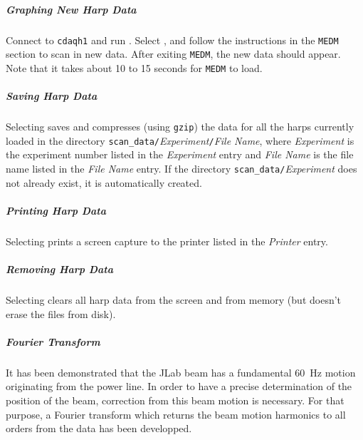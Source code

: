	\subparagraph{Graphing New Harp Data}

Connect to {\tt cdaqh1} and run .  Select , and follow the
instructions in the {\tt MEDM} section to scan in new data.  After exiting {\tt MEDM}, the new data should
appear. Note that it takes about 10 to 15 seconds for {\tt MEDM} to load.

	\subparagraph{Saving Harp Data}

Selecting  saves and compresses (using {\tt gzip}) the data for all the harps
currently loaded in the directory {\tt scan\_data/}{\it Experiment}{\tt /}{\it File Name}, where
{\it Experiment} is the experiment number listed in the {\it Experiment} entry and {\it File Name}
is the file name listed in the {\it File Name} entry.  If the directory {\tt scan\_data/}{\it Experiment}
does not already exist, it is automatically created.

	\subparagraph{Printing Harp Data}

Selecting  prints a screen capture to the printer listed in the {\it Printer} entry.

	\subparagraph{Removing Harp Data}

Selecting  clears all harp data from the screen and from memory (but doesn't
erase the files from disk).


	\subparagraph{Fourier Transform}

It has been demonstrated that the JLab beam has a fundamental 60~Hz motion originating from the power
line. In order to have a precise determination of the position of the beam, correction from this beam
motion is necessary. For that purpose, a Fourier transform which returns the beam motion harmonics to
all orders from the data has been developped.

